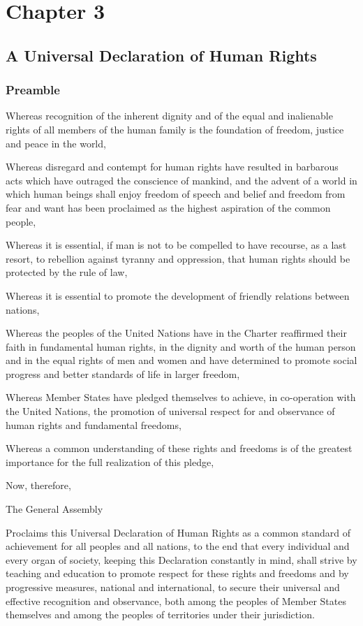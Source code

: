 \documentclass[
  titlepage,
  openright,
  DIV=calc,
  toc=listof,
  listof=nochaptergap]{scrbook}
\begin{document}
\chapter{Chapter 3}\label{sec:chapter3}

\section{A Universal Declaration of Human
Rights}\label{a-universal-declaration-of-human-rights-2}

\subsection{Preamble}\label{preamble-2}

Whereas recognition of the inherent dignity and of the equal and
inalienable rights of all members of the human family is the foundation
of freedom, justice and peace in the world,

Whereas disregard and contempt for human rights have resulted in
barbarous acts which have outraged the conscience of mankind, and the
advent of a world in which human beings shall enjoy freedom of speech
and belief and freedom from fear and want has been proclaimed as the
highest aspiration of the common people,

Whereas it is essential, if man is not to be compelled to have recourse,
as a last resort, to rebellion against tyranny and oppression, that
human rights should be protected by the rule of law,

Whereas it is essential to promote the development of friendly relations
between nations,

Whereas the peoples of the United Nations have in the Charter reaffirmed
their faith in fundamental human rights, in the dignity and worth of the
human person and in the equal rights of men and women and have
determined to promote social progress and better standards of life in
larger freedom,

Whereas Member States have pledged themselves to achieve, in
co-operation with the United Nations, the promotion of universal respect
for and observance of human rights and fundamental freedoms,

Whereas a common understanding of these rights and freedoms is of the
greatest importance for the full realization of this pledge,

Now, therefore,

The General Assembly

Proclaims this Universal Declaration of Human Rights as a common
standard of achievement for all peoples and all nations, to the end that
every individual and every organ of society, keeping this Declaration
constantly in mind, shall strive by teaching and education to promote
respect for these rights and freedoms and by progressive measures,
national and international, to secure their universal and effective
recognition and observance, both among the peoples of Member States
themselves and among the peoples of territories under their
jurisdiction.
\end{document}
